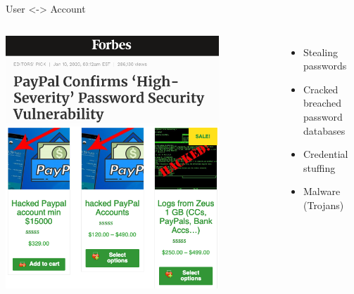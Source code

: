 \documentclass[nobackground,dvipsnames,table,aspectratio=169]{beamer}
\begin{document}
\begin{frame}{User <-> Account}
    \begin{columns}
            \centering
            \includegraphics[width=0.8\textwidth]{paypal-breach}
            \includegraphics[width=0.8\textwidth]{hacked-paypal-accounts}
            \begin{itemize}
                \item Stealing passwords
                \item Cracked breached password databases
                \item Credential stuffing
                \item Malware (Trojans)
            \end{itemize}
    \end{columns}
\end{frame}
\end{document}
